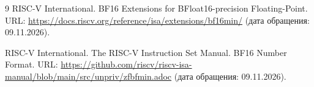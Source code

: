 
\begin{thebibliography}{9}
    RISC-V International. BF16 Extensions for BFloat16-precision
    Floating-Point. URL:
    \url{https://docs.riscv.org/reference/isa/extensions/bf16min/}
    (дата обращения: 09.11.2026).

    RISC-V International. The RISC-V Instruction Set Manual. BF16 Number
    Format. URL:
    \url{https://github.com/riscv/riscv-isa-manual/blob/main/src/unpriv/zfbfmin.adoc}
    (дата обращения: 09.11.2026).
\end{thebibliography}
